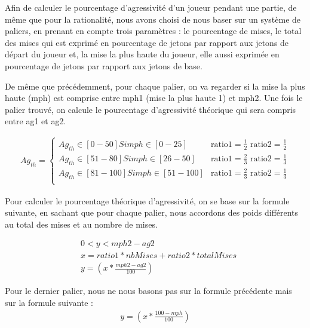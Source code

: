 \documentclass{report}
\begin{document}
\hspace{0.5cm}Afin de calculer le pourcentage d'agressivité d'un joueur pendant une partie, de même que pour la rationalité, nous avons choisi de nous baser sur un système de paliers, en prenant en compte trois paramètres : le pourcentage de mises, le total des mises qui est exprimé en pourcentage de jetons par rapport aux jetons de départ du joueur et, la mise la plus haute du joueur, elle aussi exprimée en pourcentage de jetons par rapport aux jetons de base.\par
De même que précédemment, pour chaque palier, on va regarder si la mise la plus haute (mph) est comprise entre mph1 (mise la plus haute 1) et mph2. Une fois le palier trouvé, on calcule le pourcentage d'agressivité théorique qui sera compris entre ag1 et ag2. \par


\small{
\begin{align*}
	Ag_{th}=
	\begin{cases}
		Ag_{th} \in [0-50] Si mph \in [0-25] &\text{ratio1}=\frac{1}{2} \text{ ratio2}=\frac{1}{2} \\
		Ag_{th} \in [51-80] Si mph \in [26-50] &\text{ratio1}=\frac{2}{3} \text{ ratio2}=\frac{1}{3} \\
		Ag_{th} \in [81-100] Si mph \in [51-100]  &\text{ratio1}=\frac{2}{3} \text{ ratio2}=\frac{1}{3}\\
	\end{cases}
\end{align*}

}

Pour calculer le pourcentage théorique d'agressivité, on se base sur la formule suivante, en sachant que pour chaque palier, nous accordons des poids différents au total des mises et au nombre de mises.\par

\begin{align*}
	&0<y<mph2-ag2\\
	&x=ratio1 * nbMises + ratio2 * totalMises\\
	&y=\left(x*\frac{mph2-ag2}{100}\right)
\end{align*}

Pour le dernier palier, nous ne nous basons pas sur la formule précédente mais sur la formule suivante :\\ 

\begin{align*}
	y=\left(x*\frac{100-mph}{100}\right)
\end{align*}
\end{document}
